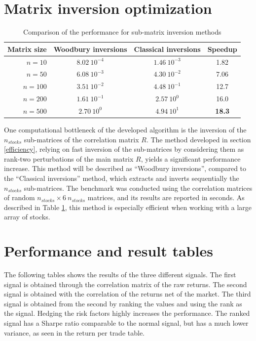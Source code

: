 \documentclass[letterpaper, 10 pt, conference]{ieeeconf}  %
\begin{document}
\begin{appendices}
\onecolumn

\section{Matrix inversion optimization}
\label{inversion_section}

\begin{table}[!h]
\centering
\caption{Comparison of the performance for sub-matrix inversion methods}
\label{inversion_table}
\begin{tabular}{|r|c|c|c|}\hline
Matrix size & Woodbury inversions & Classical inversions & Speedup \\ \hline
$n = 10$ & $8.02\ 10^{-4}$ & $1.46\ 10^{-3}$ & 1.82 \\ \hline
$n = 50$ & $6.08\ 10^{-3}$ & $4.30\ 10^{-2}$ & 7.06 \\ \hline
$n = 100$ & $3.51\ 10^{-2}$ & $4.48\ 10^{-1}$ & 12.7 \\ \hline
$n = 200$ & $1.61\ 10^{-1}$ & $2.57\ 10^{0}$ & 16.0 \\ \hline
$n = 500$ & $2.70\ 10^{0}$ & $4.94\ 10^{1}$ & \textbf{18.3} \\ \hline
\end{tabular}
\end{table}

One computational bottleneck of the developed algorithm is the inversion of the $n_{stocks}$ sub-matrices of the correlation matrix $R$. The method developed in section \ref{efficiency}, relying on fast inversion of the sub-matrices by considering them as rank-two perturbations of the main matrix $R$, yields a significant performance increase. This method will be described as ``Woodbury inversions'', compared to the ``Classical inversions'' method, which extracts and inverts sequentially the $n_{stocks}$ sub-matrices. The benchmark was conducted using the correlation matrices of random $n_{stocks} \times 6\ n_{stocks}$ matrices, and its results are reported in seconds. As described in Table \ref{inversion_table}, this method is especially efficient when working with a large array of stocks. 

\section{Performance and result tables}

The following tables shows the results of the three different signals. The first signal is obtained through the correlation matrix of the raw returns. The second signal is obtained with the correlation of the returns net of the market. The third signal is obtained from the second by ranking the values and using the rank as the signal. Hedging the risk factors highly increases the performance. The ranked signal has a Sharpe ratio comparable to the normal signal, but has a much lower variance, as seen in the return per trade table.


\end{appendices}
\end{document}
